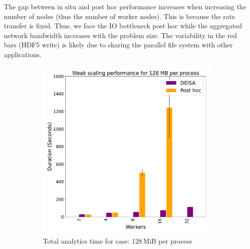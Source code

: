 The gap between in situ and post hoc performance increases when increasing the number of nodes (thus the number of \dask worker nodes). This is because the rate transfer is fixed. Thus, we face the IO bottleneck post hoc while the aggregated network bandwidth increases with the problem size.    
The variability in the red bars (HDF5 write) is likely due to sharing the parallel file system with other applications.

\begin{figure}
     \centering
     \begin{subfigure}[b]{0.3\textwidth}
         \centering
         \includegraphics[width=\textwidth, height=\textwidth]{figures/128A.pdf}
         \caption{Total analytics time for case: 128\,MiB per process}
         \label{fig:A128}
     \end{subfigure}
     \hfill
     \begin{subfigure}[b]{0.3\textwidth}
         \centering

\end{subfigure}
\end{figure}
